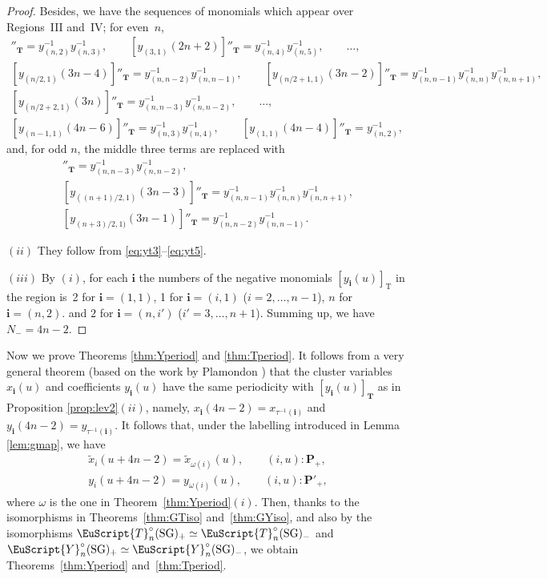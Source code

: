 \begin{proof}
Besides, we have the sequences of  monomials
which appear over Regions~III and~IV;
for even~$n$,
\begin{gather}
 [y_{(2,1)}(2n)]''_{\mathbf{T}}=y_{(n,2)}^{-1}y_{(n,3)}^{-1},
\qquad [y_{(3,1)}(2n+2)]''_{\mathbf{T}}=y_{(n,4)}^{-1}y_{(n,5)}^{-1},
\qquad \dots,\nonumber\\
 [y_{(n/2,1)}(3n-4)]''_{\mathbf{T}}=y_{(n,n-2)}^{-1}y_{(n,n-1)}^{-1},\qquad
 [y_{(n/2+1,1)}(3n-2)]''_{\mathbf{T}}=y_{(n,n-1)}^{-1}y_{(n,n)}^{-1}y_{(n,n+1)}^{-1},\nonumber\\
 [y_{(n/2+2,1)}(3n)]''_{\mathbf{T}}=y_{(n,n-3)}^{-1}y_{(n,n-2)}^{-1},\qquad
\dots,\nonumber\\
  [y_{(n-1,1)}(4n-6)]''_{\mathbf{T}}=y_{(n,3)}^{-1}y_{(n,4)}^{-1},
\qquad [y_{(1,1)}(4n-4)]''_{\mathbf{T}}=y_{(n,2)}^{-1},\label{eq:yt2}
\end{gather}
and, for odd $n$, the middle three terms are replaced with
\begin{gather}
 [y_{((n-1)/2,1)}(3n-5)]''_{\mathbf{T}}=y_{(n,n-3)}^{-1}y_{(n,n-2)}^{-1},\nonumber\\
 [y_{((n+1)/2,1)}(3n-3)]''_{\mathbf{T}}=
y_{(n,n-1)}^{-1}y_{(n,n)}^{-1}y_{(n,n+1)}^{-1},\nonumber\\
 [y_{(n+3)/2,1)}(3n-1)]''_{\mathbf{T}}=y_{(n,n-2)}^{-1}y_{(n,n-1)}^{-1}.\label{eq:yt5}
\end{gather}

$(ii)$ They  follow from
\eqref{eq:yt3}--\eqref{eq:yt5}.


$(iii)$ By $(i)$, for each  $\mathbf{i}$
the numbers of the negative monomials
$[y_{\mathbf{i}}(u)]_{\mathrm{T}}$
in the region is~2 for $\mathbf{i}= (1,1)$,
 1 for $\mathbf{i}= (i,1)$ ($i=2,\dots,n-1$),
$n$ for $\mathbf{i}= (n,2)$.
and $2$ for $\mathbf{i}=(n,i')$ ($i'=3,\dots,n+1$).
Summing up, we have $N_-=4n-2$.
\end{proof}

Now we prove
Theorems \ref{thm:Yperiod} and \ref{thm:Tperiod}.
It follows from  a very general theorem
\cite[Theorem 5.1]{Inoue10a}
(based on the work by Plamondon \cite{Plamondon10a,Plamondon10b})
that the cluster variables
$x_{\mathbf{i}}(u)$ and coef\/f\/icients $y_{\mathbf{i}}(u)$
have the same periodicity with
$[y_{\mathbf{i}}(u)]_{\mathbf{T}}$ as in Proposition \ref{prop:lev2}$(ii)$,
namely,
$x_{\mathbf{i}}(4n-2)=x_{\tau^{-1}(\mathbf{i})}$
and
$y_{\mathbf{i}}(4n-2)=y_{\tau^{-1}(\mathbf{i})}$.
It follows that, under the labelling introduced in Lemma
\ref{lem:gmap}, we have
\begin{gather}
\tilde{x}_i(u+4n-2) =\tilde{x}_{\omega(i)}(u),
\qquad (i,u):\mathbf{P}_+,\nonumber\\
y_i(u+4n-2) =y_{\omega(i)}(u),
\qquad (i,u):\mathbf{P}'_+,\label{eq:xperiod}
\end{gather}
where $\omega$ is the one in Theorem~\ref{thm:Yperiod}$(i)$.
Then, thanks to the isomorphisms
in Theorems~\ref{thm:GTiso} and~\ref{thm:GYiso},
and also by the isomorphisms
$\EuScript{T}^{\circ}_{n}(\mathrm{SG})_+
\simeq
\EuScript{T}^{\circ}_{n}(\mathrm{SG})_-
$
and
$\EuScript{Y}^{\circ}_{n}(\mathrm{SG})_+
\simeq
\EuScript{Y}^{\circ}_{n}(\mathrm{SG})_-
$,
we obtain
Theorems~\ref{thm:Yperiod} and~\ref{thm:Tperiod}.
